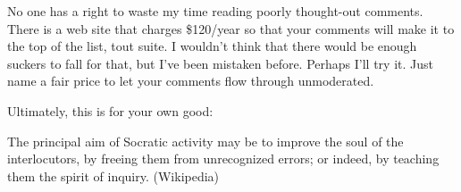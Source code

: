No one has a right to waste my time reading poorly thought-out comments. There is a web site that charges \$120/year so that your comments will make it to the top of the list, tout suite. I wouldn't think that there would be enough suckers to fall for that, but I've been mistaken before. Perhaps I'll try it. Just name a fair price to let your comments flow through unmoderated.

Ultimately, this is for your own good:

\begin{quotex}
The principal aim of Socratic activity may be to improve the soul of the interlocutors, by freeing them from unrecognized errors; or indeed, by teaching them the spirit of inquiry. (Wikipedia)
\end{quotex}




